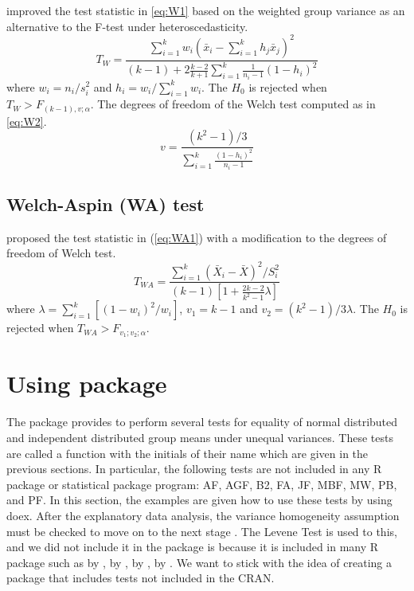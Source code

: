 \cite{welch:1951} improved the test statistic in \ref{eq:W1} based on the weighted group variance as an alternative to the F-test under heteroscedasticity.
\begin{equation}
T_W=\frac{\sum_{i=1}^k w_i(\bar{x}_i-\sum_{i=1}^k h_j\bar{x}_j)^2}{(k-1)+2\frac{k-2}{k+1}\sum_{i=1}^k \frac{1}{n_i-1}(1-h_i)^2} \label{eq:W1}
\end{equation}
where $w_i=n_i/s_i^2$ and $h_i=w_i/\sum_{i=1}^k w_i$. The $H_0$ is rejected when $T_W>F_{(k-1), v; \alpha}$. The degrees of freedom of the Welch test computed as in \ref{eq:W2}.
\begin{equation}
v=\frac{(k^2-1)/3}{\sum_{i=1}^k \frac{(1-h_i)^2}{n_i-1}} \label{eq:W2}
\end{equation}
\subsection{Welch-Aspin (WA) test}

\cite{aspin:1948} proposed the test statistic in (\ref{eq:WA1}) with a modification to the degrees of freedom of Welch test.
\begin{equation}
T_{WA}=\frac{\sum_{i=1}^k (\bar{X}_i-\bar{X})^2/S_i^2}{(k-1)[1+\frac{2k-2}{k^2-1}\lambda]} \label{eq:WA1}
\end{equation}
where $\lambda=\sum_{i=1}^k [(1-w_i)^2/w_i]$, $v_1=k-1$ and $v_2=(k^2-1)/3\lambda$. The $H_0$ is rejected when $T_{WA}>F_{v_1; v_2; \alpha}$.\\

\section{Using  package}
The  package provides to perform several tests for equality of normal distributed and  independent distributed group means under unequal variances. These tests are called a function with the initials of their name which are given in the previous sections. In particular, the following tests are not included in any R package or statistical package program: AF, AGF, B2, FA, JF, MBF, MW, PB, and PF. In this section, the examples are given how to use these tests by using doex. After the explanatory data analysis, the variance homogeneity assumption must be checked to move on to the next stage \citep{noguchi:2010, erps:2019}. The Levene Test is used to this, and we did not include it in the package is because it is included in many R package such as  by \cite{car},  by \cite{rstatix:2020},  by \cite{lawstat:2020},  by \cite{inferr:2018}. We want to stick with the idea of creating a package that includes tests not included in the CRAN. \\

